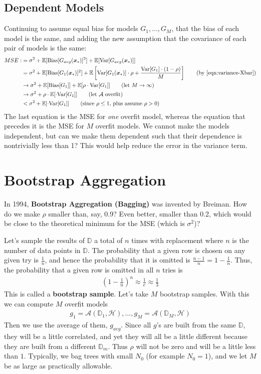 \documentclass[12pt, a4paper]{article}
\theoremstyle{definition}
\begin{document}
	\subsection*{Dependent Models}
	Continuing to assume equal bias for models $G_1,\ldots,G_M$, that
	the bias of each model is the same, and adding the new assumption that
	the covariance of each pair of models is the same:
	\begin{align*}
		MSE :
		&=\sigma^2 + \mathbb{E}[\text{Bias}[G_{avg}(\bm{x}_*)]^2]
		+\mathbb{E}[\text{Var}[G_{avg}(\bm{x}_{*})]]\\
		&=\sigma^2 + \mathbb{E}[\text{Bias}[G_{1}(\bm{x}_*)]^2]
		+\mathbb{E}\left[\text{Var}[G_{1}(\bm{x}_{*})]\cdot \rho +
		\frac{\text{Var}[G_1]\cdot (1-\rho)}{M}
		 \right]
		 \tag{by \ref{eqn:variance-Xbar}}\\
 		&\to\sigma^2 + \mathbb{E}[\text{Bias}[G_1]] +
 		\mathbb{E}[\rho \cdot \text{Var}[G_1]]
 		\tag{let $M\to\infty$}\\
 		&\to\sigma^2+\rho \cdot \mathbb{E}[\cdot \text{Var}[G_1]]
 		\tag{let $\mathcal{A}$ overfit}\\
 		&<\sigma^2 + \mathbb{E}[\cdot \text{Var}[G_1]]
 		\tag{since $\rho \leq 1$, plus assume $\rho>0$}
	\end{align*}
	The last equation is the MSE for \textit{one} overfit model, whereas
	the equation that precedes it is the MSE for $M$ overfit models.
	We cannot make the models independent, but can we make them dependent
	such that their dependence is nontrivially less than 1? This would
	help reduce the error in the variance term.
	\section*{Bootstrap Aggregation}
	In 1994, \textbf{Bootstrap Aggregation (Bagging)} was invented by
	Breiman. How do we make $\rho$ smaller than, say, 0.9? Even better,
	smaller than 0.2, which would be close to the theoretical minimum
	for the MSE (which is $\sigma^2$)?
	
	Let's sample the results of $\mathbb{D}$ a total of $n$ times with replacement
	where $n$ is the number of data points in $\mathbb{D}$.
	The probability that a given row is chosen on any given try is
	$\frac{1}{n}$, and hence the probability that it is omitted is
	$\frac{n-1}{n}=1-\frac{1}{n}$. Thus, the probability that a given
	row is omitted in all $n$ tries is
	\begin{align*}
		\left(1 - \frac{1}{n}\right)^n\approx \frac{1}{e}\approx \frac{1}{3}
	\end{align*}
	This is called a \textbf{bootstrap sample}. Let's take $M$ bootstrap samples.
	With this we can compute $M$ overfit models
	\begin{align*}
		g_1 = \mathcal{A}(\mathbb{D}_1,\mathcal{H}),\ldots,
		g_M = \mathcal{A}(\mathbb{D}_M, \mathcal{H})
	\end{align*}
	Then we use the average of them, $g_{avg}$. Since all $g$'s are built
	from the same $\mathbb{D}$, they will be a little correlated, and yet
	they will all be a little different because they are built from a different
	$\mathbb{D}_m$. Thus $\rho$ will not be zero and will be a little less
	than $1$. Typically, we bag trees with small $N_0$ (for example $N_0 = 1$),
	and we let $M$ be as large as practically allowable.
\end{document}
